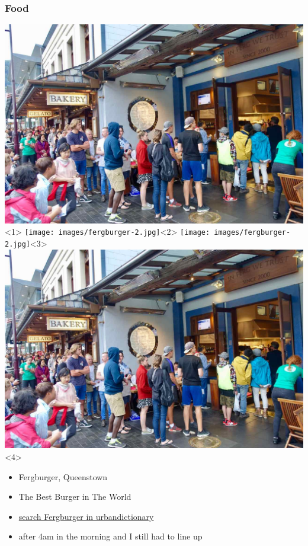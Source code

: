 \documentclass[12pt]{beamer}
\begin{document}
        \begin{frame}
            \frametitle{Food}
            \begin{center}
                \includegraphics[height=0.5\textheight]{images/fergburger.jpg}<1>
                \texttt{[image: images/fergburger-2.jpg]}<2>
                \texttt{[image: images/fergburger-2.jpg]}<3>
                \includegraphics[height=0.5\textheight]{images/fergburger.jpg}<4>
            \end{center}

                \begin{itemize}
                    \item Fergburger, Queenstown
                    \pause
                    \item The Best Burger in The World
                    \pause
                    \item \href{https://www.urbandictionary.com/define.php?term=Fergburger}{search Fergburger in urbandictionary}
                    \pause
                    \item after 4am in the morning and I still had to line up
                \end{itemize}
        \end{frame}
    
    
\end{document}

